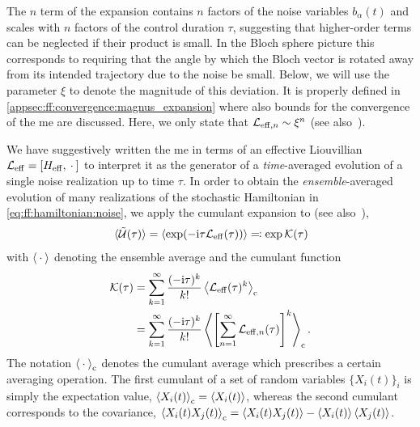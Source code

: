 The $n$ term of the expansion contains $n$ factors of the noise variables $b_\alpha(t)$ and scales with $n$ factors of the control duration $\tau$, suggesting that higher-order terms can be neglected if their product is small.
In the Bloch sphere picture this corresponds to requiring that the angle by which the Bloch vector is rotated away from its intended trajectory due to the noise be small.
Below, we will use the parameter $\xi$ to denote the magnitude of this deviation.
It is properly defined in \cref{appsec:ff:convergence:magnus_expansion} where also bounds for the convergence of the \gls{me} are discussed.
Here, we only state that $\mathcal{L}_{\mathrm{eff},n}\sim\xi^n$ (see also~).

We have suggestively written the \gls{me} in terms of an effective Liouvillian $\Li_\mr{eff} = \comm{H_\mr{eff}}{\placeholder}$ to interpret it as the generator of a \emph{time}-averaged evolution of a single noise realization up to time $\tau$.
In order to obtain the \emph{ensemble}-averaged evolution of many realizations of the stochastic Hamiltonian in \cref{eq:ff:hamiltonian:noise}, we apply the cumulant expansion to \liouvUe (see also~),
\begin{equation}\label{eq:ff:cumulant_expansion}
    \ev*{\liouvUe(\tau)} = \ev{\exp(-\i\tau\Li_\mr{eff}(\tau))} \eqqcolon \exp\cumulantfun(\tau)
\end{equation}
with $\ev{\placeholder}$ denoting the ensemble average  and the cumulant function~\cite{Kubo1962}
\begin{align}
    \cumulantfun(\tau) &= \sum_{k=1}^\infty\frac{(-\i\tau)^k}{k!}\ev{\Li_\mr{eff}(\tau)^k}_\mr{c} \\
                       &= \sum_{k=1}^\infty\frac{(-\i\tau)^k}{k!}\ev{\left[\sum_{n=1}^\infty \Li_{\mr{eff},n}(\tau)\right]^k}_\mr{c}. \label{eq:ff:cumulant}
\end{align}
The notation $\ev{\placeholder}_\mr{c}$ denotes the cumulant average which prescribes a certain averaging operation.
The first cumulant of a set of random variables $\{X_i(t)\}_i$ is simply the expectation value, $\ev{X_i(t)}_\mr{c} = \ev{X_i(t)}$, whereas the second cumulant corresponds to the covariance, $\ev{X_i(t)X_j(t)}_\mr{c} = \ev{X_i(t)X_j(t)} - \ev{X_i(t)}\ev{X_j(t)}$.
